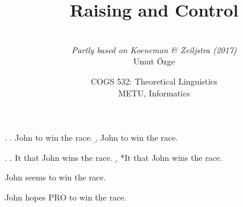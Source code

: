 \documentclass[ignorenonframetext,8pt,aspectratio=169]{beamer}
\title{Raising and Control}
\author{\  \\  {\it Partly based on Koeneman \& Zeiljstra (2017)} \\ \vspace{20pt} Umut \"Ozge\\  }
\date{COGS 532: Theoretical Linguistics\\ METU, Informatics}
\begin{document}
\begin{frame}\frametitle{}
\thispagestyle{empty}
\maketitle
\end{frame}

\begin{frame}[t,plain]{}

\bigskip
		\ex.
		\a. John  to win the race. \medskip
		\b. John  to win the race.

\bigskip
\bigskip

		\ex.
		\a. It  that John wins the race. \medskip
		\b. *It  that John wins the race.

\end{frame}

\begin{frame}[t,plain]{}
\vspace{50pt}
\hspace{60pt}John\hspace{20pt} seems\hspace{20pt} to\hspace{20pt} win\hspace{20pt} the\hspace{20pt} race.
\vspace{80pt}

\hspace{60pt}John\hspace{20pt} hopes\hspace{20pt} PRO\hspace{20pt} to\hspace{20pt} win\hspace{20pt} the\hspace{20pt} race.

\end{frame}
\end{document}
